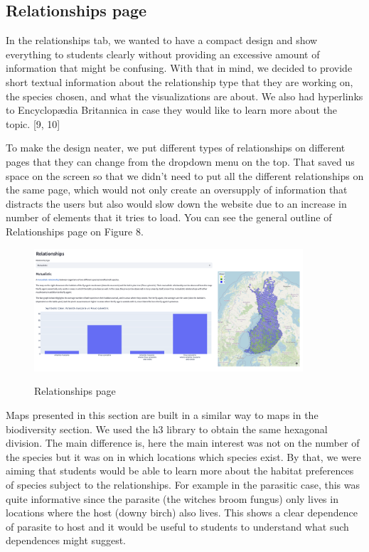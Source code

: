 \documentclass{article}
\begin{document}
\subsection{Relationships page}
In the relationships tab, we wanted to have a compact design and show everything to students clearly without providing an excessive amount of information that might be confusing. With that in mind, we decided to provide short textual information about the relationship type that they are working on, the species chosen, and what the visualizations are about. We also had hyperlinks to Encyclopædia Britannica in case they would like to learn more about the topic. [9, 10]
\par
To make the design neater, we put different types of relationships on different pages that they can change from the dropdown menu on the top. That saved us space on the screen so that we didn’t need to put all the different relationships on the same page, which would not only create an oversupply of information that distracts the users but also would slow down the website due to an increase in number of elements that it tries to load. You can see the general outline of Relationships page on Figure 8.
\newpage
\begin{figure}[h]
	\vspace*{-3mm}
	\centering
	\includegraphics[width=10cm]{relationships_page}\label{relationships_page}
	\vspace*{-2mm}
	\caption{Relationships page}
	\vspace*{-2mm}
\end{figure}
Maps presented in this section are built in a similar way to maps in the biodiversity section. We used the h3 library to obtain the same hexagonal division. The main difference is, here the main interest was not on the number of the species but it was on in which locations which species exist. By that, we were aiming that students would be able to learn more about the habitat preferences of species subject to the relationships. For example in the parasitic case, this was quite informative since the parasite (the witches broom fungus) only lives in locations where the host (downy birch) also lives. This shows a clear dependence of parasite to host and it would be useful to students to understand what such dependences might suggest.
\end{document}
